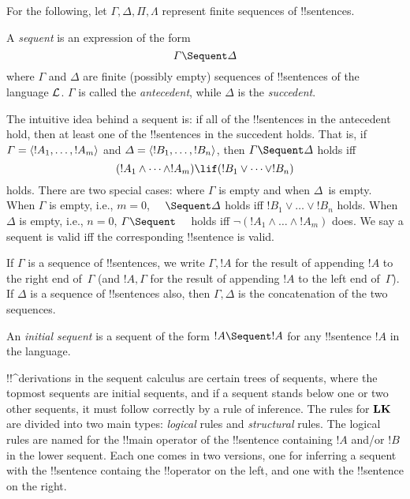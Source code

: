 \documentclass[../../../include/open-logic-section]{subfiles}
\begin{document}


For the following, let $\Gamma, \Delta, \Pi, \Lambda$ represent finite
sequences of !!{sentence}s.

\begin{defn}[Sequent]
A \emph{sequent} is an expression of the form
\[
\Gamma \Sequent \Delta
\]
where $\Gamma$ and $\Delta$ are finite (possibly empty) sequences of
!!{sentence}s of the language $\mathcal L$. $\Gamma$ is called the
\emph{antecedent}, while $\Delta$ is the \emph{succedent}.
\end{defn}

\begin{explain}
The intuitive idea behind a sequent is: if all of the !!{sentence}s in
the antecedent hold, then at least one of the !!{sentence}s in the
succedent holds. That is, if $\Gamma = \langle !A_1, \dots, !A_m \rangle$ and
$\Delta = \langle !B_1, \dots, !B_n \rangle$, then $\Gamma \Sequent \Delta$
holds iff
\[
(!A_1 \land \cdots \land !A_m) \lif (!B_1 \lor \cdots \lor
!B_n)
\]
holds. There are two special cases: where $\Gamma$ is empty and when
$\Delta$~is empty. When $\Gamma$ is empty, i.e., $m = 0$, $\quad
\Sequent \Delta$ holds iff $!B_1 \lor \dots \lor !B_n$ holds. When
$\Delta$ is empty, i.e., $n = 0$, $\Gamma \Sequent \quad$ holds iff
$\lnot(!A_1 \land \dots \land !A_m)$ does.  We say a sequent is valid
iff the corresponding !!{sentence} is valid.
\end{explain}

If $\Gamma$ is a sequence of !!{sentence}s, we write $\Gamma, !A$ for
the result of appending $!A$ to the right end of~$\Gamma$ (and $!A,
\Gamma$ for the result of appending $!A$ to the left end
of~$\Gamma$). If $\Delta$ is a sequence of !!{sentence}s also, then $\Gamma,
\Delta$ is the concatenation of the two sequences.

\begin{defn}
An \emph{initial sequent} is a sequent
{of the form $!A \Sequent !A$} for any !!{sentence} $!A$ in the language.
\end{defn}

!!^{derivation}s in the sequent calculus are certain trees of
sequents, where the topmost sequents are initial sequents, and if a
sequent stands below one or two other sequents, it must follow
correctly by a rule of inference.  The rules for $\mathbf{LK}$ are
divided into two main types: \emph{logical} rules and
\emph{structural} rules.  The logical rules are named for the !!{main
  operator} of the !!{sentence} containing $!A$ and/or $!B$ in the
lower sequent. Each one comes in two versions, one for inferring a
sequent with the !!{sentence} containg the !!{operator} on the left,
and one with the !!{sentence} on the right.
\end{document}
